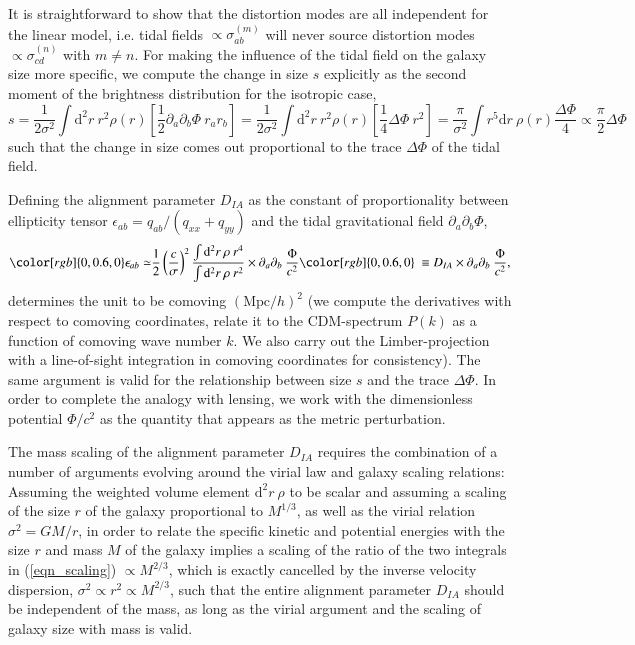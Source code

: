 \documentclass[a4paper,fleqn,usenatbib]{mnras}
\newcommand{\dd}{\mathrm{d}}
\newcommand{\MyGreen}{\color[rgb]{0,0.6,0}}
\def\rut#1{{\MyGreen  #1}}
\begin{document}
It is straightforward to show that the distortion modes are all independent for the linear model, i.e. tidal fields $\propto\sigma^{(m)}_{ab}$ will never source distortion modes $\propto\sigma^{(n)}_{cd}$ with $m\neq n$. For making the influence of the tidal field on the galaxy size more specific, we compute the change in size $s$ explicitly as the second moment of the brightness distribution for the isotropic case,
\begin{equation}
s = 
\frac{1}{2\sigma^2}\int\dd^2r\:r^2\rho(r)\left[\frac{1}{2}\partial_a\partial_b\Phi\: r_ar_b\right] =
\frac{1}{2\sigma^2}\int\dd^2r\:r^2\rho(r)\left[\frac{1}{4}\Delta\Phi\:r^2\right] = 
\frac{\pi}{\sigma^2}\int r^5\dd r\:\rho(r)\frac{\Delta\Phi}{4} \propto \frac{\pi}{2}\Delta\Phi
\end{equation}
such that the change in size comes out proportional to the trace $\Delta\Phi$ of the tidal field. 

\rut{Defining the alignment parameter $D_{IA}$ as the constant of proportionality between ellipticity \rut{tensor $\epsilon_{ab} =q_{ab}/(q_{xx}+q_{yy})$ and the} tidal gravitational field $\partial_a\partial_b\Phi$,
\begin{equation}
\rut{\epsilon_{ab} \simeq} \frac{1}{2}\left(\frac{c}{\sigma}\right)^2\frac{\int\mathrm{d}^2r\:\rho\:r^4}{\int\mathrm{d}^2r\:\rho\:r^2}\times\partial_a\partial_b\:\frac{\Phi}{c^2}  \rut{~\equiv D_{IA}\times\partial_a\partial_b\:\frac{\Phi}{c^2}},
\label{eqn_scaling}
\end{equation}
determines the unit to be comoving $(\mathrm{Mpc}/h)^2$  \rut{(we compute the derivatives with respect to comoving coordinates, relate it to the CDM-spectrum $P(k)$ as a function of comoving wave number $k$. We also carry out the Limber-projection with a line-of-sight integration in comoving coordinates for consistency)}. The same argument is valid for the relationship between size $s$ and the trace $\Delta\Phi$. In order to complete the analogy with lensing, we work with the dimensionless potential $\Phi/c^2$ as the quantity that appears as the metric perturbation.}

\rut{The mass scaling of the alignment parameter $D_{IA}$ requires the combination of a number of arguments evolving around the virial law and galaxy scaling relations: Assuming the weighted volume element $\mathrm{d}^2r\:\rho$ to be scalar and assuming a scaling of the size $r$ of the galaxy proportional to $M^{1/3}$, as well as the virial relation $\sigma^2 = GM/r$, in order to relate the specific kinetic and potential energies with the size $r$ and mass $M$ of the galaxy implies a scaling of the ratio of the two integrals in (\ref{eqn_scaling}) $\propto M^{2/3}$, which is exactly cancelled by the inverse velocity dispersion, $\sigma^2\propto r^2 \propto M^{2/3}$, such that the entire alignment parameter $D_{IA}$ should be independent of the mass, as long as the virial argument and the scaling of galaxy size with mass is valid.}
\end{document}
